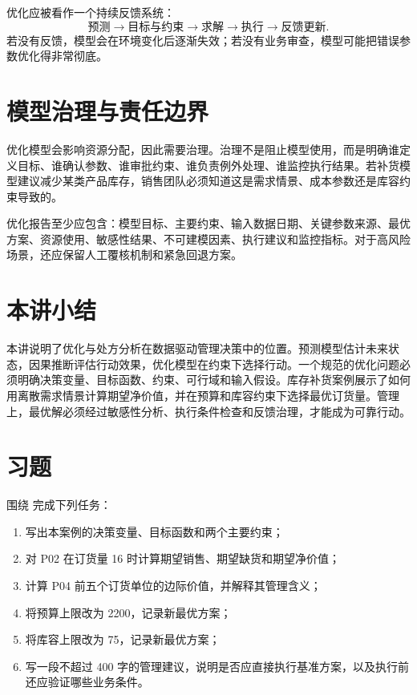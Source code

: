 \documentclass[UTF8,fontset=fandol,openany,zihao=-4]{ctexbook}
\begin{document}
优化应被看作一个持续反馈系统：
\[
\text{预测}
\rightarrow
\text{目标与约束}
\rightarrow
\text{求解}
\rightarrow
\text{执行}
\rightarrow
\text{反馈更新}.
\]
若没有反馈，模型会在环境变化后逐渐失效；若没有业务审查，模型可能把错误参数优化得非常彻底。

\section{模型治理与责任边界}

优化模型会影响资源分配，因此需要治理。治理不是阻止模型使用，而是明确谁定义目标、谁确认参数、谁审批约束、谁负责例外处理、谁监控执行结果。若补货模型建议减少某类产品库存，销售团队必须知道这是需求情景、成本参数还是库容约束导致的。

优化报告至少应包含：模型目标、主要约束、输入数据日期、关键参数来源、最优方案、资源使用、敏感性结果、不可建模因素、执行建议和监控指标。对于高风险场景，还应保留人工覆核机制和紧急回退方案。

\section*{本讲小结}

本讲说明了优化与处方分析在数据驱动管理决策中的位置。预测模型估计未来状态，因果推断评估行动效果，优化模型在约束下选择行动。一个规范的优化问题必须明确决策变量、目标函数、约束、可行域和输入假设。库存补货案例展示了如何用离散需求情景计算期望净价值，并在预算和库容约束下选择最优订货量。管理上，最优解必须经过敏感性分析、执行条件检查和反馈治理，才能成为可靠行动。

\section*{习题}

\begin{exercise}
围绕  完成下列任务：
\begin{enumerate}
  \item 写出本案例的决策变量、目标函数和两个主要约束；
  \item 对 P02 在订货量 16 时计算期望销售、期望缺货和期望净价值；
  \item 计算 P04 前五个订货单位的边际价值，并解释其管理含义；
  \item 将预算上限改为 2200，记录新最优方案；
  \item 将库容上限改为 75，记录新最优方案；
  \item 写一段不超过 400 字的管理建议，说明是否应直接执行基准方案，以及执行前还应验证哪些业务条件。
\end{enumerate}
\end{exercise}
\end{document}
